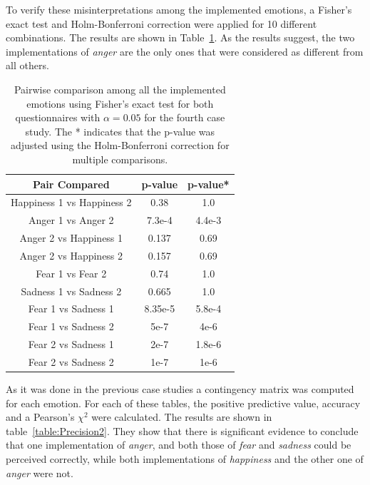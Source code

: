 To verify these misinterpretations among the implemented emotions, a Fisher's exact test and Holm-Bonferroni correction were applied for 10 different combinations. The results are shown in Table~\ref{table:result_compare_fourth}. As the results suggest, the two implementations of \textit{anger} are the only ones that were considered as different from all others.

\begin{table}[h]
\centering
\small
\caption{Pairwise comparison among all the implemented emotions using Fisher's exact test for both questionnaires with $\alpha = 0.05$ for the fourth case study. The * indicates that the p-value was adjusted using the Holm-Bonferroni correction for multiple comparisons.}
		\label{table:result_compare_fourth}
		\begin{tabular}{|c|c|c|}
			\hline	
\textbf{Pair Compared} & \textbf{p-value} & \textbf{p-value*}\\	
			\hline
			Happiness 1 vs Happiness 2 &0.38&1.0\\
			\hline
			Anger 1 vs Anger 2 & 7.3e-4&4.4e-3\\
			\hline
			Anger 2 vs Happiness 1 & 0.137&0.69\\
			\hline
			Anger 2 vs Happiness 2 & 0.157&0.69\\
			\hline
			Fear 1 vs Fear 2 & 0.74&1.0\\
			\hline
			Sadness 1 vs Sadness 2 & 0.665&1.0\\
			\hline
			Fear 1 vs Sadness 1& 8.35e-5&5.8e-4\\
			\hline
			Fear 1 vs Sadness 2 & 5e-7&4e-6\\
			\hline
			Fear 2 vs Sadness 1 & 2e-7&1.8e-6\\
			\hline
			Fear 2 vs Sadness 2 & 1e-7&1e-6\\
			\hline
			\end{tabular}
\end{table}
 
As it was done in the previous case studies a contingency matrix was computed for each emotion. 
For each of these tables, the positive predictive value, accuracy and a Pearson's $\chi^2$ were calculated. The results are shown in table~\ref{table:Precision2}. They show that there is significant evidence to conclude that one implementation of \textit{anger}, and both those of \textit{fear} and \textit{sadness} could be perceived correctly, while both implementations of \textit{happiness} and the other one of \textit{anger} were not.

